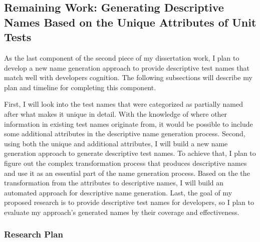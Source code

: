 \subsection{Remaining Work: Generating Descriptive Names Based on the Unique Attributes of Unit Tests}
\label{sec:remaining-work}

As the last component of the second piece of my dissertation work, I plan to develop a new name generation approach to provide descriptive test names that match well with developers cognition.
%
The following subsections will describe my plan and timeline for completing this component.

First, I will look into the test names that were categorized as partially named after what makes it unique in detail.
%
With the knowledge of where other information in existing test names originate from, it would be possible to include some additional attributes in the descriptive name generation process.
%
Second, using both the unique and additional attributes, I will build a new name generation approach to generate descriptive test names.
%
To achieve that, I plan to figure out the complex transformation process that produces descriptive names and use it as an essential part of the name generation process.
%
Based on the the transformation from the attributes to descriptive names, I will build an automated approach for descriptive name generation.
%
Last, the goal of my proposed research is to provide descriptive test names for developers, so I plan to evaluate my approach's generated names by their coverage and effectiveness.


\subsubsection{Research Plan}


